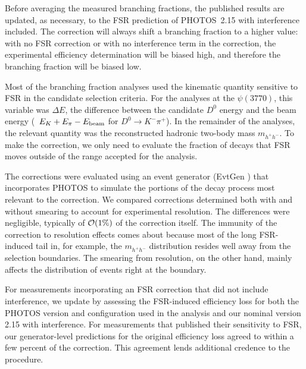 Before averaging the measured branching fractions, the published 
results are updated, as necessary, to the FSR prediction of 
PHOTOS~2.15 with interference included.  The correction will 
always shift a branching fraction to a higher value: with no 
FSR correction or with no interference term in the correction, 
the experimental efficiency determination will be biased high, 
and therefore the branching fraction will be biased low.

Most of the branching fraction analyses used the kinematic quantity 
sensitive to FSR in the candidate selection criteria.  For the 
analyses at the $\psi(3770)$, this variable was $\Delta E$, the 
difference between the candidate $D^0$ energy and the beam energy 
(\eg\ $E_K + E_\pi - E_{\rm beam}$ for $D^0\to K^-\pi^+$).  
In the remainder of the analyses, the relevant quantity was the 
reconstructed hadronic two-body mass $m_{h^+h^-}$.  To make the 
correction, 
we  only need to evaluate the fraction of decays that FSR moves 
outside of the range accepted for the analysis.  

The corrections were evaluated using an event generator (EvtGen 
\cite{Ryd:2005zz}) that incorporates PHOTOS to simulate the 
portions of the decay process most relevant to the correction.  
We compared corrections determined both with and without smearing 
to account for experimental resolution.  The differences were 
negligible, typically of ${\cal O}(1\%)$ of the correction itself.  
The immunity of the correction to resolution effects comes about because 
most of the long FSR-induced tail in, for example, the $m_{h^+h^-}$ 
distribution resides well away from the selection boundaries.  The 
smearing from resolution, on the other hand, mainly affects the 
distribution of events right at the boundary.

For measurements incorporating an FSR correction that did not 
include interference, we update by assessing the FSR-induced 
efficiency loss for both the PHOTOS version and configuration 
used in the analysis and our nominal version 2.15 with interference.  
For measurements that published their sensitivity to FSR, our 
generator-level predictions for the original efficiency loss 
agreed to within a few percent %
of the correction. 
This agreement 
lends additional credence to the procedure.

